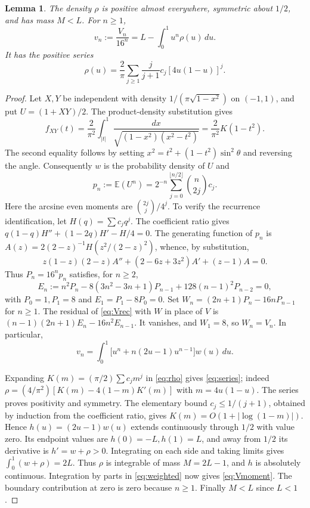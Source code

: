 \documentclass[11pt]{article}
\newtheorem{lemma}{Lemma}
\newcommand{\E}{\mathbb E}
\begin{document}
\begin{lemma}\label{lem:rho}
The density $\rho$ is positive almost everywhere, symmetric about
$1/2$, and has mass $M<L$. For $n\geq1$,
\begin{equation}\label{eq:Vmoment}
 v_n:=\frac{V_n}{16^n}=L-\int_0^1u^n\rho(u)\,du.
\end{equation}
It has the positive series
\begin{equation}\label{eq:series}
 \rho(u)=\frac2\pi\sum_{j\geq1}\frac{j}{j+1}c_j
                 [4u(1-u)]^j.
\end{equation}
\end{lemma}

\begin{proof}
Let $X,Y$ be independent with density $1/(\pi\sqrt{1-x^2})$ on
$(-1,1)$, and put $U=(1+XY)/2$. The product-density substitution gives
\[
 f_{XY}(t)=\frac2{\pi^2}\int_{|t|}^1
 \frac{dx}{\sqrt{(1-x^2)(x^2-t^2)}}
 =\frac2{\pi^2}K(1-t^2).
\]
The second equality follows by setting
$x^2=t^2+(1-t^2)\sin^2\theta$ and reversing the angle.
Consequently $w$ is the probability density of $U$ and
\[
 p_n:=\E(U^n)=2^{-n}\sum_{j=0}^{\lfloor n/2\rfloor}\binom n{2j}c_j.
\]
Here the arcsine even moments are $\binom{2j}j/4^j$.
To verify the recurrence identification, let $H(q)=\sum c_jq^j$.
The coefficient ratio gives
$q(1-q)H''+(1-2q)H'-H/4=0$.
The generating function of $p_n$ is
$A(z)=2(2-z)^{-1}H(z^2/(2-z)^2)$, whence, by substitution,
\[
 z(1-z)(2-z)A''+(2-6z+3z^2)A'+(z-1)A=0.
\]
Thus $P_n=16^np_n$ satisfies, for $n\geq2$,
\[
 E_n:=n^2P_n-8(3n^2-3n+1)P_{n-1}+128(n-1)^2P_{n-2}=0,
\]
with $P_0=1,P_1=8$ and $E_1=P_1-8P_0=0$.
Set $W_n=(2n+1)P_n-16nP_{n-1}$ for $n\geq1$.
The residual of \eqref{eq:Vrec} with $W$ in place of $V$ is
$(n-1)(2n+1)E_n-16n^2E_{n-1}$.
It vanishes, and $W_1=8$, so $W_n=V_n$. In particular,
\begin{equation}\label{eq:weighted}
 v_n=\int_0^1\bigl[u^n+n(2u-1)u^{n-1}\bigr]w(u)\,du.
\end{equation}

Expanding $K(m)=(\pi/2)\sum c_jm^j$ in \eqref{eq:rho} gives
\eqref{eq:series}; indeed
$\rho=(4/\pi^2)[K(m)-4(1-m)K'(m)]$ with $m=4u(1-u)$.
The series proves positivity and symmetry.
The elementary bound $c_j\leq1/(j+1)$, obtained by induction from
the coefficient ratio, gives $K(m)=O(1+|\log(1-m)|)$.
Hence $h(u)=(2u-1)w(u)$ extends continuously through $1/2$ with
value zero. Its endpoint values are $h(0)=-L,h(1)=L$, and away
from $1/2$ its derivative is $h'=w+\rho>0$.
Integrating on each side and taking limits gives
$\int_0^1(w+\rho)=2L$. Thus $\rho$ is integrable of mass
$M=2L-1$, and $h$ is absolutely continuous.
Integration by parts in \eqref{eq:weighted} now gives
\eqref{eq:Vmoment}. The boundary contribution at zero is zero because
$n\geq1$. Finally $M<L$ since $L<1$.
\end{proof}
\end{document}
